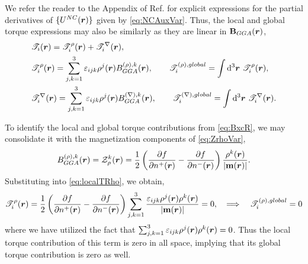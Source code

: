 We refer the reader to the Appendix of Ref. \cite{Li17_2591} for explicit expressions for the partial derivatives of $\{U^{NC}(\boldsymbol{r})\}$
given by \cref{eq:NCAuxVar}.
Thus, the local and global torque expressions may also be similarly as they are linear in $\mathbf{B}_{GGA}(\boldsymbol{r})$,
\begin{align}
&\mathscr{T}_i(\boldsymbol{r}) = \mathscr{T}^\rho_i(\boldsymbol{r}) + \mathscr{T}^\nabla_i(\boldsymbol{r}),\\
&\mathscr{T}^\rho_i(\boldsymbol{r}) = \sum_{j,k=1}^3\varepsilon_{ijk} \rho^j(\boldsymbol{r}) B^{(\rho),k}_{GGA}(\boldsymbol{r}), \qquad \mathscr{T}_i^{(\rho), global} = \int \mathrm{d}^3\boldsymbol{r}\text{ } \mathscr{T}_i^{\rho}(\boldsymbol{r}) \label{eq:localTRho},\\
&\mathscr{T}^\nabla_i(\boldsymbol{r}) = \sum_{j,k=1}^3\varepsilon_{ijk} \rho^j(\boldsymbol{r}) B^{(\nabla),k}_{GGA}(\boldsymbol{r}), \qquad \mathscr{T}_i^{(\nabla), global} = \int \mathrm{d}^3\boldsymbol{r}\text{ } \mathscr{T}_i^{\nabla}(\boldsymbol{r}) \label{eq:localTG}.
\end{align}

To identify the local and global torque contributions from \cref{eq:BxcR}, we  may consolidate it with the magnetization components of \cref{eq:ZrhoVar},
\begin{equation}
B^{(\rho),k}_{GGA}(\boldsymbol{r}) = \mathcal{Z}^k_{\rho}(\boldsymbol{r}) = \frac{1}{2} \left(\dfrac{\partial f}{\partial n^+(\boldsymbol{r})} - \dfrac{\partial f}{\partial n^-(\boldsymbol{r})}\right) 
  \frac{\rho^k(\boldsymbol{r})}{\vert \mathbf{m}(\boldsymbol{r}) \vert} . \label{eq:BxcR_eval}
\end{equation}
Substituting into \cref{eq:localTRho}, we obtain,
\begin{equation}
\mathscr{T}^\rho_i(\boldsymbol{r}) = \frac{1}{2} \left(\dfrac{\partial f}{\partial n^+(\boldsymbol{r})} - \dfrac{\partial f}{\partial n^-(\boldsymbol{r})}\right) 
  \sum_{j,k = 1}^3 \frac{\varepsilon_{ijk}\rho^j(\boldsymbol{r})\rho^k(\boldsymbol{r})}{\vert\mathbf{m}(\boldsymbol{r})\vert}  = 0, \quad \Longrightarrow \quad \mathscr{T}_i^{(\rho), global} = 0 \label{eq:torR}
\end{equation}
where we have utilized the fact that $\sum_{j,k =1}^3\varepsilon_{ijk}\rho^j(\boldsymbol{r})\rho^k(\boldsymbol{r}) = 0$. Thus the local torque contribution of this term is zero in all space, implying that
its global torque contribution is zero as well.

